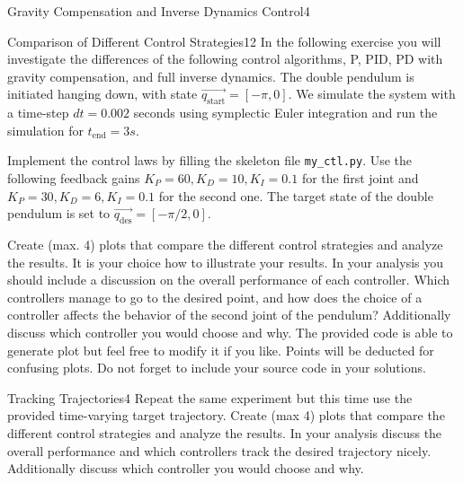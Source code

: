 \begin{questions}
\begin{question}{Gravity Compensation and Inverse Dynamics Control}{4}
	\end{question}
	
	
	\begin{question}{Comparison of Different Control Strategies}{12}
		In the following exercise you will investigate the differences of the following control algorithms, P, PID, PD with gravity compensation, and full inverse dynamics.
		The double pendulum is initiated hanging down, with state $\vec{q_\textrm{start}}={[-\pi,0]}$. We simulate the system with a time-step $dt=0.002$ seconds using symplectic Euler integration and run the simulation for $t_\textrm{end}=3s$. 
		
		Implement the control laws by filling the skeleton file \texttt{my\_ctl.py}. Use the following feedback gains $K_P=60, K_D=10, K_I=0.1$ for the first joint and $K_P=30, K_D=6, K_I=0.1$ for the second one.
		The target state of the double pendulum is set to $\vec{q_\textrm{des}}={[-\pi / 2,0]}$. 
		
		Create (max. 4) plots that compare the different control strategies and analyze the results. It is your choice how to illustrate your results. In your analysis you should include a discussion on the overall performance of each controller. Which controllers manage to go to the desired point, and how does the choice of a controller affects the behavior of the second joint of the pendulum? Additionally discuss which controller you would choose and why. The provided code is able to generate plot but feel free to modify it if you like. Points will be deducted for confusing plots. Do not forget to include your source code in your solutions.
		
\begin{answer}
	
\end{answer}
		
	\end{question}
	
	
	\begin{question}{Tracking Trajectories}{4}
		Repeat the same experiment but this time use the provided time-varying target trajectory. Create (max 4) plots that compare the different control strategies and analyze the results. In your analysis discuss the overall performance and which controllers track the desired trajectory nicely. Additionally discuss which controller you would choose and why.
		

\end{question}
\end{questions}
